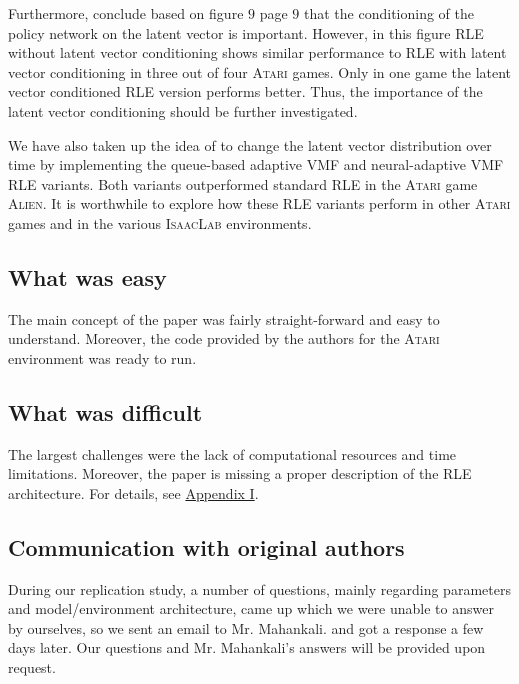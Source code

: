 \documentclass[10pt]{article} %
\begin{document}
Furthermore, \cite{rle-paper} conclude based on figure $9$ page $9$ that the conditioning of the policy network on the latent vector is important. However, in this figure \textsc{RLE} without latent vector conditioning shows similar performance to \textsc{RLE} with latent vector conditioning in three out of four \textsc{Atari} games. Only in one game the latent vector conditioned \textsc{RLE} version performs better. Thus, the importance of the latent vector conditioning should be further investigated.

We have also taken up the idea of \cite{rle-paper} to change the latent vector distribution over time by implementing the queue-based adaptive VMF and neural-adaptive VMF \textsc{RLE} variants. Both variants outperformed standard \textsc{RLE} in the \textsc{Atari} game \textsc{Alien}. It is worthwhile to explore how these \textsc{RLE} variants perform in other \textsc{Atari} games and in the various \textsc{IsaacLab} environments.

\subsection{What was easy}

The main concept of the paper was fairly straight-forward and easy to understand. Moreover, the code provided by the authors for the \textsc{Atari} environment was ready to run.

\subsection{What was difficult}

The largest challenges were the lack of computational resources and time limitations. Moreover, the paper is missing a proper description of the \textsc{RLE} architecture. For details, see \hyperlink{appendix-difficult}{Appendix I}.

\subsection{Communication with original authors}

During our replication study, a number of questions, mainly regarding parameters and model/environment architecture, came up which we were unable to answer by ourselves, so we sent an email to Mr. Mahankali. and got a response a few days later. Our questions and Mr. Mahankali's answers will be provided upon request. 

\vspace{-3pt}
\end{document}
